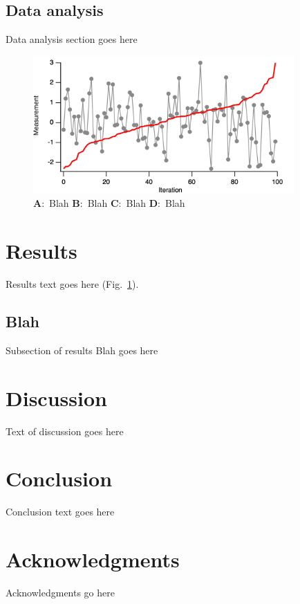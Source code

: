 \documentclass[11pt,a4]{article}
\begin{document}
\subsection*{Data analysis}
Data analysis section goes here




\begin{figure}
     \centering
     \includegraphics[width=10cm]{Fig_1}
        \caption{
                \textbf{A}:~Blah
                \textbf{B}:~Blah
                \textbf{C}:~Blah
                \textbf{D}:~Blah
        }
        \label{fig:1}
\end{figure}

\section*{Results}
\begin{justify}
Results text goes here 
(Fig.~\ref{fig:1}).
\subsection*{Blah}
Subsection of results Blah goes here
\end{justify}

\section*{Discussion}
\begin{justify}
Text of discussion goes here
\end{justify}


\section*{Conclusion}
\begin{justify}
Conclusion text goes here

\end{justify}

\section*{Acknowledgments}

Acknowledgments go here

\nolinenumbers




\end{document}
